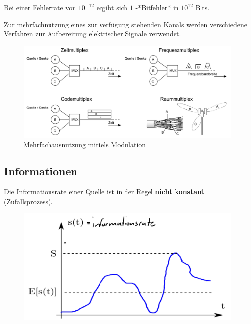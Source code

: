 \documentclass[
  10pt,
  a4paper,
  german]{article}
\numberwithin{equation}{section}
\begin{document}
Bei einer Fehlerrate von \(10^{-12}\) ergibt sich \(1\) -*Bitfehler* in
\(10^{12}\) Bits.

Zur mehrfachnutzung eines zur verfügung stehenden Kanals werden
verschiedene Verfahren zur Aufbereitung elektrischer Signale verwendet.

\begin{figure}[H]

{\centering \includegraphics{images/01_Multiplexing.png}

}

\caption{Mehrfachausnutzung mittels Modulation}

\end{figure}

\hypertarget{informationen}{%
\subsection{Informationen}\label{informationen}}

Die Informationsrate einer Quelle ist in der Regel \textbf{nicht
konstant} (Zufallsprozess).

\begin{figure}[H]

{\centering \includegraphics{images/01_Informationsrate.png}

}

\end{figure}
\end{document}
